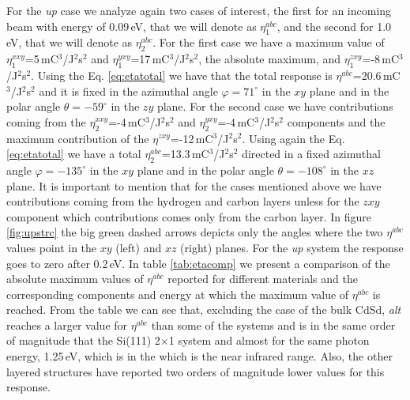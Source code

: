 \documentclass[pss]{wiley2sp} %
\begin{document}
For the \emph{up} case we analyze again two cases of interest, the first for an incoming beam with energy of 0.09\,eV, that we will denote as $\eta^{abc}_{1}$, and the second for 1.0\,eV, that we will denote as $\eta^{abc}_{2}$. For the first case we have a maximum value of $\eta^{xxy}_{1}$=5\,mC$^{3}$/J$^{2}$s$^{2}$ and $\eta^{yxy}_{1}$=17\,mC$^{3}$/J$^{2}$s$^{2}$, the absolute maximum, and $\eta^{zxy}_{1}$=-8\,mC$^{3}$/J$^{2}$s$^{2}$. Using the Eq. \ref{eq:etatotal} we have that the total response is $\eta^{abc}$=20.6\,mC$^{3}$/J$^{2}$s$^{2}$ and it is fixed in the azimuthal angle $\varphi=71^{\circ}$ in the $xy$ plane and in the polar angle $\theta=-59^{\circ}$ in the $zy$ plane. For the second case we have contributions coming from the $\eta^{xxy}_{2}$=-4\,mC$^{3}$/J$^{2}$s$^{2}$ and $\eta^{yxy}_{2}$=-4\,mC$^{3}$/J$^{2}$s$^{2}$ components and the maximum contribution of the $\eta^{zxy}$=-12\,mC$^{3}$/J$^{2}$s$^{2}$. Using again the Eq. \eqref{eq:etatotal} we have a total $\eta^{abc}_{2}$=13.3\,mC$^{3}$/J$^{2}$s$^{2}$ directed in a fixed azimuthal angle $\varphi=-135^{\circ}$ in the $xy$ plane and in the polar angle $\theta=-108^{\circ}$ in the $xz$ plane. It is important to mention that for the cases mentioned above we have contributions coming from the hydrogen and carbon layers unless for the $zxy$ component which contributions comes only from the carbon layer. In figure \ref{fig:upstrc} the big green dashed arrows depicts only the angles where the two $\eta^{abc}$ values point in the $xy$ (left) and $xz$ (right) planes. For the \emph{up} system the response goes to zero after 0.2\,eV. In table \ref{tab:etacomp} we present a comparison of the absolute maximum values of $\eta^{abc}$ reported for different materials and the corresponding components and energy at which the maximum value of $\eta^{abc}$ is reached. From the table we can see that, excluding the case of the bulk CdSd, \emph{alt} reaches a larger value for $\eta^{abc}$ than some of the systems and is in the same order of magnitude that the Si(111) 2$\times$1 system and almost for the same photon energy, 1.25\,eV, which is in the which is the near infrared range. Also, the other layered structures have reported two orders of magnitude lower values for this response.
\end{document}
